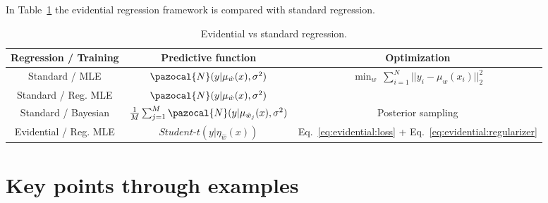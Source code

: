 In Table~\ref{table:summary} the evidential regression framework is compared with standard regression. 
\begin{table}[H]
	\centering
	\begin{tabular}{ | c | c | c |}
		\hline
		\textbf{Regression / Training} & \textbf{Predictive function} & \textbf{Optimization} \\
		\hline
		Standard / MLE & $\pazocal{N}(y|\mu_{\hat{w}}(x), \sigma^2)$ & $\min_w \ \sum_{i=1}^{N}||y_i-\mu_w(x_i)||_2^2$ \\
		\hline
		 Standard / Reg. MLE & $\pazocal{N}(y|\mu_{\hat{w}}(x), \sigma^2)$ & 
		 \vtop{\hbox{\strut $\min_w \ \sum_{i=1}^{N}||y_i-\mu_w(x_i)||_2^2$}\hbox{\strut $+ \lambda||w||_2^2$}} \\
		\hline
		 Standard / Bayesian& $\frac{1}{M}\sum_{j=1}^{M} \pazocal{N}(y|\mu_{\hat{w}_j}(x), \sigma^2)$ & Posterior sampling \\
		 \hline
		 Evidential / Reg. MLE & $\textit{Student-t}(y|\eta_{\hat{w}}(x))$ & Eq.~\eqref{eq:evidential:loss} + Eq.~\eqref{eq:evidential:regularizer} \\
		\hline
	\end{tabular}
\caption{Evidential vs standard regression.}
\label{table:summary}
\end{table}

\section{Key points through examples}

